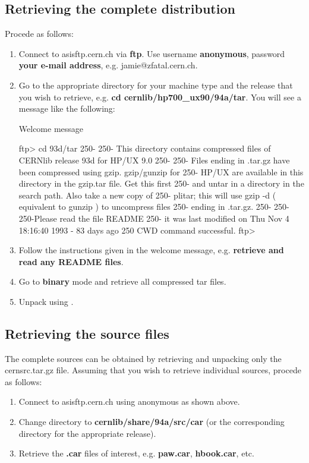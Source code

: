 \subsection{Retrieving the complete distribution}

Procede as follows:

\begin{enumerate}
\item
Connect to asisftp.cern.ch via {\bf ftp}.
Use username {\bf anonymous}, password {\bf your e-mail address}, e.g. jamie@zfatal.cern.ch.
\item
Go to the appropriate directory for your machine type and the release that
you wish to retrieve, e.g. {\bf cd cernlib/hp700\_ux90/94a/tar}. You will see
a message like the following:

\begin{XMPt}{Welcome message}

ftp> cd 93d/tar
250-
250- This directory contains compressed files of CERNlib release 93d for HP/UX 9.0
250-
250- Files ending in .tar.gz have been compressed using gzip. gzip/gunzip for
250- HP/UX are available in this directory in the gzip.tar file. Get this first
250- and untar in a directory in the search path. Also take a new copy of 
250- plitar; this will use gzip -d ( equivalent to gunzip ) to uncompress files
250- ending in .tar.gz.
250- 
250-
250-Please read the file README
250-  it was last modified on Thu Nov  4 18:16:40 1993 - 83 days ago
250 CWD command successful.
ftp> 

\end{XMPt}
\item
Follow the instructions given in the welcome message, e.g.
{\bf retrieve and read any README files}.
\item
Go to {\bf binary} mode and retrieve all compressed tar files.
\item
Unpack using \plitar{}.
\end{enumerate}

\subsection{Retrieving the source files}

The complete sources can be obtained by retrieving and unpacking
only the cernsrc.tar.gz file. Assuming that you wish to retrieve
individual sources, procede as follows:

\begin{enumerate}
\item
Connect to asisftp.cern.ch using anonymous \ftp{} as shown
above.
\item
Change directory to {\bf cernlib/share/94a/src/car} (or the corresponding
directory for the appropriate release).
\item
Retrieve the {\bf .car} files of interest, e.g.
{\bf paw.car}, {\bf hbook.car}, etc.
\end{enumerate}

